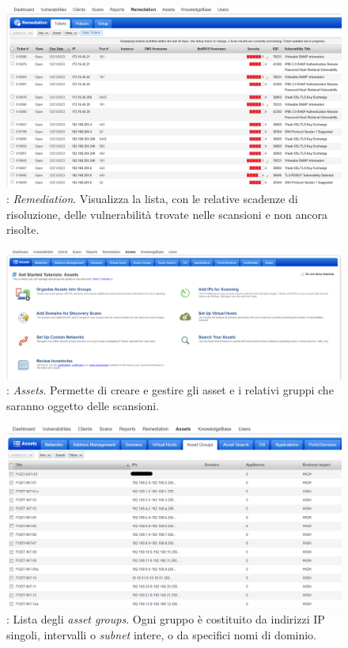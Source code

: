 \documentclass[target=bach,aauheader=]{thud}
\begin{document}
\begin{figure}[!]
\centering
\includegraphics[scale=0.425]{images/qualys_remediation.png}
    \caption{: \textit{Remediation}. Visualizza la lista, con le relative scadenze di risoluzione, delle vulnerabilità trovate nelle scansioni e non ancora risolte.}
\end{figure}

\begin{figure}[h]
\centering
\includegraphics[scale=0.329]{images/qualys_assets.png}
    \caption{: \textit{Assets}. Permette di creare e gestire gli asset e i relativi gruppi che saranno oggetto delle scansioni.}
\end{figure}

\begin{figure}[!]
    \centering
    \includegraphics[width=1\linewidth]{images/qualys_targets.png}
    \caption{: Lista degli \textit{asset groups}. Ogni gruppo è costituito da indirizzi IP singoli, intervalli o \textit{subnet} intere, o da specifici nomi di dominio.}
    \label{fig:qualys_targets}
\end{figure}
\end{document}
